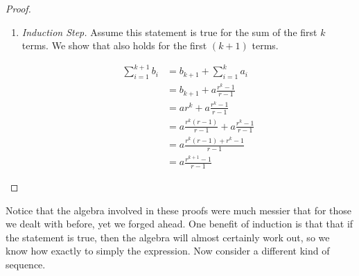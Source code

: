 \documentclass[twoside]{report}
\begin{document}
\begin{proof}
\begin{enumerate}
		\item \emph{Induction Step.} Assume this statement is true for the sum of the first $k$ terms. We show that also holds for the first $(k + 1)$ terms.
		
		\begin{align*}
			\sum_{i = 1}^{k + 1} b_i &=  b_{k + 1} + \sum_{i = 1}^k a_i \\
			&= b_{k + 1} + a \frac{r^k - 1}{r - 1} \\
			&= ar^k +  a \frac{r^k - 1}{r - 1} \\
			&= a \frac{r^k(r - 1)}{r - 1} + a \frac{r^k - 1}{r - 1} \\
			&= a \frac{r^k(r - 1) + r^k - 1}{r - 1} \\
			&= a \frac{r^{k + 1} - 1}{r - 1}
		\end{align*}
	\end{enumerate}	
\end{proof}
\vspace{\baselineskip}

Notice that the algebra involved in these proofs were much messier that for those we dealt with before, yet we forged ahead. One benefit of induction is that that if the statement is true, then the algebra will almost certainly work out, so we know how exactly to simply the expression. Now consider a different kind of sequence.
\end{document}
